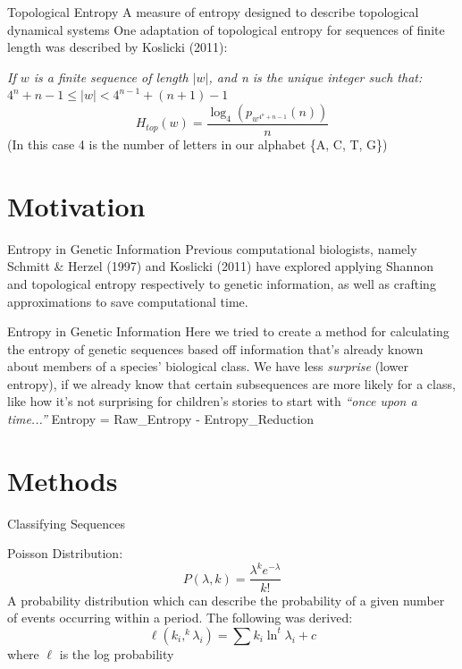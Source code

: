 \documentclass[12pt]{beamer}
\begin{document}
	\begin{frame}{Topological Entropy}
		A measure of entropy designed to describe topological dynamical systems
		\vfill
		One adaptation of topological entropy for sequences of finite length was described by Koslicki (2011):
		
		\emph{If $w$ is a finite sequence of length $|w|$, and n is the unique integer such that:}
		$4^{n}+n-1 \leq |w| < 4^{n-1} +(n+1) -1$
		\begin{equation}
			H_{top}(w) = \frac{\log_{4}(p_{w^{4^{n}+n -1}} (n))}{n}
		\end{equation}
		(In this case 4 is the number of letters in our alphabet \{A, C, T, G\})
	\end{frame}

	\section{Motivation}

	\begin{frame}{Entropy in Genetic Information}
		Previous computational biologists, namely Schmitt \& Herzel (1997) and Koslicki (2011) have explored applying Shannon and topological entropy respectively to genetic information, as well as crafting approximations to save computational time.
	\end{frame}

	\begin{frame}{Entropy in Genetic Information}
		Here we tried to create a method for calculating the entropy of genetic sequences based off information that's already known about members of a species' biological class.
		\vfill
		We have less \emph{surprise} (lower entropy), if we already know that certain subsequences are more likely for a class, like how it's not surprising for children's stories to start with \emph{``once upon a time...''}
		\vfill
		Entropy = Raw\_Entropy - Entropy\_Reduction
	\end{frame}

	\section{Methods}
	\begin{frame}{Classifying Sequences}
		
		Poisson Distribution: \newline
		\begin{equation}
			P(\lambda, k)={\frac {\lambda ^{k}e^{-\lambda }}{k!}}
		\end{equation}
		A probability distribution which can describe the probability of a given number of events occurring within a period.
		\vfill
		The following was derived:
		\begin{equation}
			\ell(k_{i}, ^k\lambda_{i}) = \sum k_{i}\ln ^t\lambda_{i} + c
		\end{equation}
		where $\ell$ is the log probability
	\end{frame}
\end{document}
